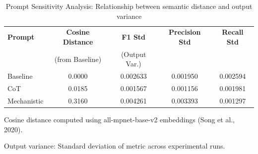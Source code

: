 \begin{table}[htbp]
\centering
\caption{Prompt Sensitivity Analysis: Relationship between semantic distance and output variance}
\label{tab:sensitivity_analysis}
\begin{tabular}{lcccc}
\toprule
\textbf{Prompt} & \textbf{Cosine Distance} & \textbf{F1 Std} & \textbf{Precision Std} & \textbf{Recall Std} \\
 & (from Baseline) & (Output Var.) & & \\
\midrule
Baseline & 0.0000 & 0.002633 & 0.001950 & 0.002594 \\
CoT & 0.0185 & 0.001567 & 0.001156 & 0.001981 \\
Mechanistic & 0.3160 & 0.004261 & 0.003393 & 0.001297 \\
\bottomrule
\end{tabular}
\begin{tablenotes}
\small
\item Cosine distance computed using all-mpnet-base-v2 embeddings (Song et al., 2020).
\item Output variance: Standard deviation of metric across experimental runs.
\end{tablenotes}
\end{table}